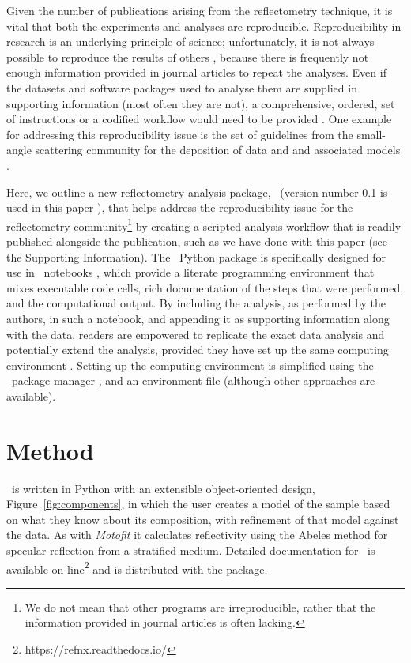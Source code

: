 \documentclass[pdf,preprint]{iucr}
\begin{document}
Given the number of publications arising from the reflectometry technique, it is vital that both the experiments and analyses are reproducible.
Reproducibility in research is an underlying principle of science; unfortunately, it is not always possible to reproduce the results of others \cite{Stark2018}, because there is frequently not enough information provided in journal articles to repeat the analyses. Even if the datasets and software packages used to analyse them are supplied in supporting information (most often they are not), a comprehensive, ordered, set of instructions or a codified workflow would need to be provided \cite{Moeller2017a}.
One example for addressing this reproducibility issue is the set of guidelines from the small-angle scattering community for the deposition of data and and associated models \cite{Trewhella:jc5010, pauw2013}.

Here, we outline a new reflectometry analysis package, \ (version number 0.1 is used in this paper \cite{refnx}), that helps address the reproducibility issue for the reflectometry community\footnote{We do not mean that other programs are irreproducible, rather that the information provided in journal articles is often lacking.} by creating a scripted analysis workflow that is readily published alongside the publication, such as we have done with this paper (see the Supporting Information).
The \ Python package is specifically designed for use in \Jupyter\ notebooks \cite{Kluyver:2016aa}, which provide a literate programming environment that mixes executable code cells, rich documentation of the steps that were performed, and the computational output. By including the analysis, as performed by the authors, in such a notebook, and appending it as supporting information along with the data, readers are empowered to replicate the exact data analysis and potentially extend the analysis, provided they have set up the same computing environment \cite{Millman2014}. Setting up the computing environment is simplified using the \conda\ package manager \cite{conda}, and an environment file (although other approaches are available).

\section{Method}

\ is written in Python with an extensible object-oriented design, Figure~\ref{fig:components}, in which the user creates a model of the sample based on what they know about its composition, with refinement of that model against the data. As with \emph{Motofit} \cite{Nelson2006} it calculates reflectivity using the Abeles method \cite{Heavens1955} for specular reflection from a stratified medium.
Detailed documentation for \ is available on-line\footnote{https://refnx.readthedocs.io/} and is distributed with the package.
\end{document}
